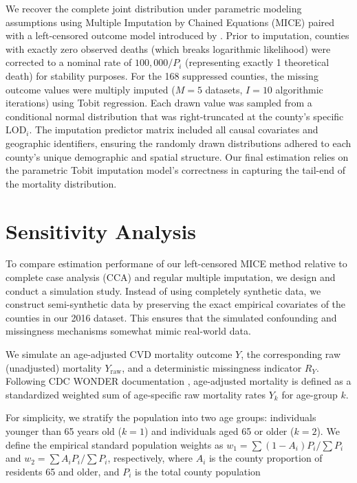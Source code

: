 \documentclass{article}
\theoremstyle{plain}
\theoremstyle{definition}
\theoremstyle{remark}
\begin{document}
We recover the complete joint distribution under parametric modeling assumptions 
using Multiple Imputation by Chained Equations (MICE) paired with a 
left-censored outcome model introduced by \citep{keil2019quantile}. Prior to imputation, counties 
with exactly zero observed deaths (which breaks logarithmic likelihood) were corrected to a nominal rate of $100,000 / P_i$ (representing exactly 1 
theoretical death) for stability purposes. For the 168 suppressed counties, the 
missing outcome values were multiply imputed ($M=5$ datasets, $I=10$ algorithmic 
iterations) using Tobit regression. Each drawn value was 
sampled from a conditional normal distribution that was right-truncated 
at the county's specific $\text{LOD}_i$. The imputation predictor matrix 
included all causal covariates and geographic identifiers, ensuring the randomly
drawn distributions adhered to each county's unique demographic and 
spatial structure. Our final estimation relies on 
the parametric Tobit imputation model's correctness in capturing the tail-end of 
the mortality distribution.

\section{Sensitivity Analysis}
\label{sensitivity}

To compare estimation performane of our left-censored MICE method relative to complete case analysis (CCA) and regular 
multiple imputation, we design and conduct a simulation study. 
Instead of using completely synthetic data, we construct 
semi-synthetic data by preserving the exact empirical covariates  of 
the counties in our 2016 dataset. This ensures that the simulated 
confounding and missingness mechanisms somewhat mimic real-world data.

We simulate an age-adjusted CVD mortality outcome $Y$, the corresponding raw 
(unadjusted) mortality $Y_{\text{raw}}$, and a deterministic missingness 
indicator $R_Y$. Following CDC WONDER documentation \citep{cdc_wonder_cmf_doc}, 
age-adjusted mortality is defined as a standardized weighted 
sum of age-specific raw mortality rates $Y_k$ for age-group $k$.

For simplicity, we stratify the population into two age groups: individuals younger than 65 years old ($k=1$) 
and individuals aged 65 or older ($k=2$). We define the empirical standard 
population weights as $w_1 = \sum (1-A_i)P_i / \sum P_i$ and 
$w_2 = \sum A_i P_i / \sum P_i$, respectively, where $A_i$ is the county 
proportion of residents 65 and older, and $P_i$ is the total county population
\end{document}
